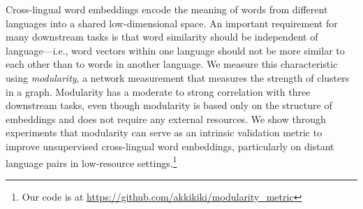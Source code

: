 Cross-lingual word embeddings encode the meaning of words from different
languages into a shared low-dimensional space.
An important requirement for many downstream tasks is that word
similarity should be independent of language---i.e., word vectors
within one language should not be more similar to each other than to
words in another language.
We measure this characteristic using {\it modularity}, a
network measurement that measures the strength of clusters in a graph.
Modularity has a moderate to strong correlation with three downstream
tasks, even though modularity is based only on the structure of
embeddings and does not require any external resources.
We show through experiments that modularity can serve as an intrinsic validation metric to
improve unsupervised cross-lingual word embeddings, 
particularly on distant language pairs in low-resource settings.\footnote{Our
code is at \url{https://github.com/akkikiki/modularity_metric}}
